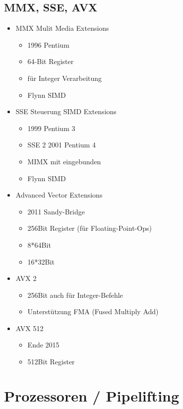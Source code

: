 \subsection{MMX, SSE, AVX}
\begin{itemize}
	\item MMX Mulit Media Extensions
	\begin{itemize}
		\item 1996 Pentium
		\item 64-Bit Register
		\item für Integer Verarbeitung
		\item Flynn SIMD
	\end{itemize}
	\item SSE Steuerung SIMD Extensions
	\begin{itemize}
		\item 1999 Pentium 3
		\item SSE 2 2001 Pentium 4
		\item MIMX mit eingebunden
		\item Flynn SIMD
	\end{itemize}
	\item Advanced Vector Extensions
	\begin{itemize}
		\item 2011 Sandy-Bridge
		\item 256Bit Register (für Floating-Point-Ops)
		\item 8*64Bit
		\item 16*32Bit
	\end{itemize}
	\item AVX 2
	\begin{itemize}
		\item 256Bit auch für Integer-Befehle
		\item Unterstützung FMA (Fused Multiply Add)
	\end{itemize}
	\item AVX 512
	\begin{itemize}
		\item Ende 2015 
		\item 512Bit Register
	\end{itemize}
\end{itemize}

\section{Prozessoren / Pipelifting}
